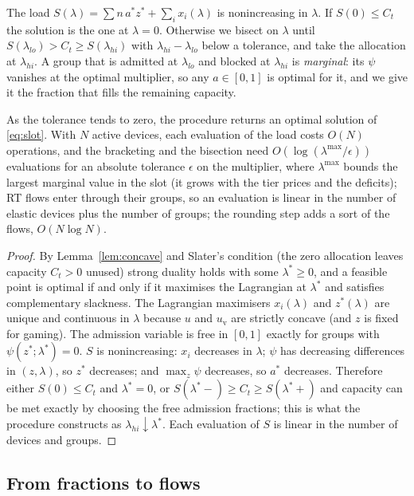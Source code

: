 The load $S(\lambda)=\sum n\,a^*z^*+\sum_i x_i(\lambda)$ is nonincreasing in $\lambda$.
If $S(0)\le C_t$ the solution is the one at $\lambda=0$.
Otherwise we bisect on $\lambda$ until $S(\lambda_{lo})>C_t\ge S(\lambda_{hi})$ with $\lambda_{hi}-\lambda_{lo}$ below a tolerance, and take the allocation at $\lambda_{hi}$.
A group that is admitted at $\lambda_{lo}$ and blocked at $\lambda_{hi}$ is \emph{marginal}: its $\psi$ vanishes at the optimal multiplier, so any $a\in[0,1]$ is optimal for it, and we give it the fraction that fills the remaining capacity.

\begin{proposition}[Solver]\label{prop:solver}
As the tolerance tends to zero, the procedure returns an optimal solution of \eqref{eq:slot}.
With $N$ active devices, each evaluation of the load costs $O(N)$ operations, and the bracketing and the bisection need $O(\log(\lambda^{\max}/\epsilon))$ evaluations for an absolute tolerance $\epsilon$ on the multiplier, where $\lambda^{\max}$ bounds the largest marginal value in the slot (it grows with the tier prices and the deficits); RT flows enter through their groups, so an evaluation is linear in the number of elastic devices plus the number of groups; the rounding step adds a sort of the flows, $O(N\log N)$.
\end{proposition}
\begin{proof}
By Lemma~\ref{lem:concave} and Slater's condition (the zero allocation leaves capacity $C_t>0$ unused) strong duality holds with some $\lambda^*\ge0$, and a feasible point is optimal if and only if it maximises the Lagrangian at $\lambda^*$ and satisfies complementary slackness.
The Lagrangian maximisers $x_i(\lambda)$ and $z^*(\lambda)$ are unique and continuous in $\lambda$ because $u$ and $u_{\mathrm{v}}$ are strictly concave (and $z$ is fixed for gaming).
The admission variable is free in $[0,1]$ exactly for groups with $\psi(z^*;\lambda^*)=0$.
$S$ is nonincreasing: $x_i$ decreases in $\lambda$; $\psi$ has decreasing differences in $(z,\lambda)$, so $z^*$ decreases; and $\max_z\psi$ decreases, so $a^*$ decreases.
Therefore either $S(0)\le C_t$ and $\lambda^*=0$, or $S(\lambda^*-)\ge C_t\ge S(\lambda^*+)$ and capacity can be met exactly by choosing the free admission fractions; this is what the procedure constructs as $\lambda_{hi}\downarrow\lambda^*$.
Each evaluation of $S$ is linear in the number of devices and groups.
\end{proof}

\subsection{From fractions to flows}

